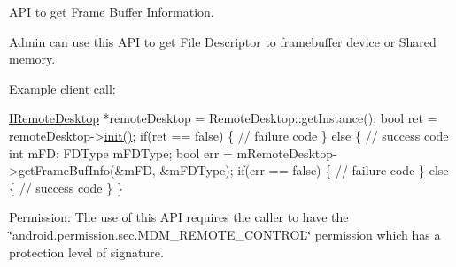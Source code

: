 \-A\-P\-I to get \-Frame \-Buffer \-Information. 

\-Admin can use this \-A\-P\-I to get \-File \-Descriptor to framebuffer device or \-Shared memory. 

\-Example client call\-:


\begin{DoxyPre}
  \hyperlink{classandroid_1_1IRemoteDesktop}{IRemoteDesktop} *remoteDesktop = RemoteDesktop::getInstance();
  bool ret = remoteDesktop->\hyperlink{classandroid_1_1IRemoteDesktop_a5792cf8c7fa9eeb8e21f39927d0fed1e}{init()};
  if(ret == false)  \{
     // failure code
  \} else \{
     // success code	 
     int	     mFD;
     FDType 	 mFDType;
     bool err = mRemoteDesktop->getFrameBufInfo(&mFD, &mFDType);
     if(err == false)  \{
         // failure code
     \} else \{
         // success code	 
     \}
  \}
 \end{DoxyPre}


\begin{DoxyParagraph}{\-Permission\-: }
\-The use of this \-A\-P\-I requires the caller to have the \char`\"{}android.\-permission.\-sec.\-M\-D\-M\-\_\-\-R\-E\-M\-O\-T\-E\-\_\-\-C\-O\-N\-T\-R\-O\-L\char`\"{} permission which has a protection level of signature.
\end{DoxyParagraph}

